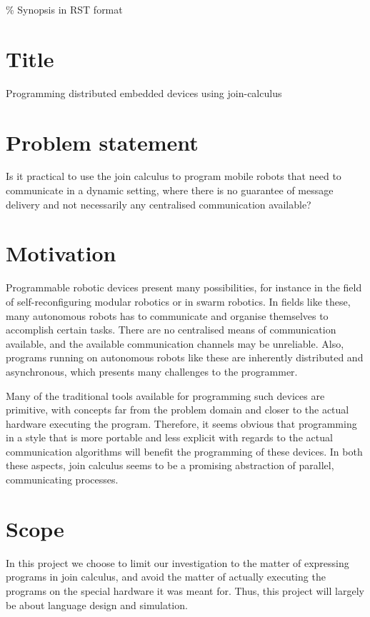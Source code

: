 ﻿\% Synopsis in RST format

\section{Title}

Programming distributed embedded devices using join-calculus

\section{Problem statement}

Is it practical to use the join calculus to program mobile robots
that need to communicate in a dynamic setting, where there is no
guarantee of message delivery and not necessarily any centralised
communication available?

\section{Motivation}

Programmable robotic devices present many possibilities, for
instance in the field of self-reconfiguring modular robotics or in
swarm robotics. In fields like these, many autonomous robots has to
communicate and organise themselves to accomplish certain tasks.
There are no centralised means of communication available, and the
available communication channels may be unreliable. Also, programs
running on autonomous robots like these are inherently distributed
and asynchronous, which presents many challenges to the
programmer.

Many of the traditional tools available for programming such
devices are primitive, with concepts far from the problem domain
and closer to the actual hardware executing the program. Therefore,
it seems obvious that programming in a style that is more portable
and less explicit with regards to the actual communication
algorithms will benefit the programming of these devices. In both
these aspects, join calculus seems to be a promising abstraction of
parallel, communicating processes.

\section{Scope}

In this project we choose to limit our investigation to the matter
of expressing programs in join calculus, and avoid the matter of
actually executing the programs on the special hardware it was
meant for. Thus, this project will largely be about language design
and simulation.

